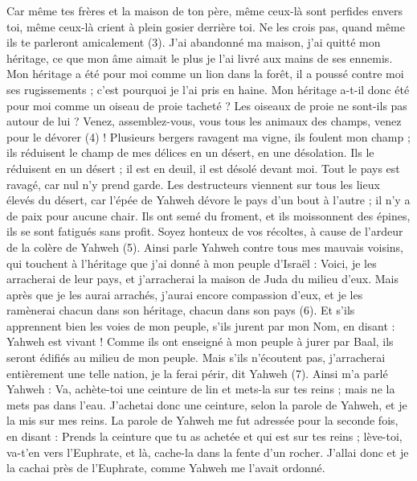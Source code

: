 \begin{multicols}{2}
Car même tes frères et la maison de ton père, même ceux-là sont perfides envers toi, même ceux-là crient à plein gosier derrière toi. Ne les crois pas, quand même ils te parleront amicalement\FTNT{} (3).
J'ai abandonné ma maison, j'ai quitté mon héritage, ce que mon âme aimait le plus je l'ai livré aux mains de ses ennemis.
Mon héritage a été pour moi comme un lion dans la forêt, il a poussé contre moi ses rugissements ; c'est pourquoi je l'ai pris en haine.
Mon héritage a-t-il donc été pour moi comme un oiseau de proie tacheté ? Les oiseaux de proie ne sont-ils pas autour de lui ? Venez, assemblez-vous, vous tous les animaux des champs, venez pour le dévorer\FTNT{} (4) !
Plusieurs bergers ravagent ma vigne, ils foulent mon champ ; ils réduisent le champ de mes délices en un désert, en une désolation.
Ils le réduisent en un désert ; il est en deuil, il est désolé devant moi. Tout le pays est ravagé, car nul n’y prend garde.
Les destructeurs viennent sur tous les lieux élevés du désert, car l'épée de Yahweh dévore le pays d’un bout à l’autre ; il n'y a de paix pour aucune chair.
Ils ont semé du froment, et ils moissonnent des épines, ils se sont fatigués sans profit. Soyez honteux de vos récoltes, à cause de l'ardeur de la colère de Yahweh\FTNT{} (5).
Ainsi parle Yahweh contre tous mes mauvais voisins, qui touchent à l'héritage que j'ai donné à mon peuple d'Israël : Voici, je les arracherai de leur pays, et j'arracherai la maison de Juda du milieu d'eux.
Mais après que je les aurai arrachés, j'aurai encore compassion d'eux, et je les ramènerai chacun dans son héritage, chacun dans son pays\FTNT{} (6).
Et s'ils apprennent bien les voies de mon peuple, s’ils jurent par mon Nom, en disant : Yahweh est vivant ! Comme ils ont enseigné à mon peuple à jurer par Baal, ils seront édifiés au milieu de mon peuple.
Mais s'ils n'écoutent pas, j'arracherai entièrement une telle nation, je la ferai périr, dit Yahweh\FTNT{} (7).
\VerseOne{}Ainsi m’a parlé Yahweh : Va, achète-toi une ceinture de lin et mets-la sur tes reins ; mais ne la mets pas dans l'eau.
J'achetai donc une ceinture, selon la parole de Yahweh, et je la mis sur mes reins.
La parole de Yahweh me fut adressée pour la seconde fois, en disant :
Prends la ceinture que tu as achetée et qui est sur tes reins ; lève-toi, va-t’en vers l'Euphrate, et là, cache-la dans la fente d'un rocher.
J’allai donc et je la cachai près de l'Euphrate, comme Yahweh me l’avait ordonné.

\end{multicols}
